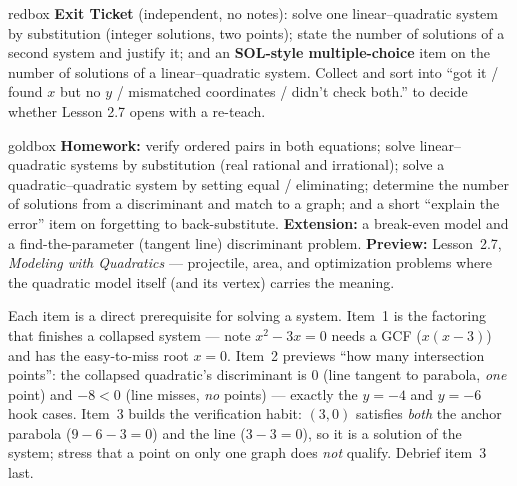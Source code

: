 \documentclass[10pt]{article}
\begin{document}
\begin{skillbox}{redbox}
\textbf{Exit Ticket} (independent, no notes): solve one linear--quadratic system by substitution (integer
solutions, two points); state the number of solutions of a second system and justify it; and an
\textbf{SOL-style multiple-choice} item on the number of solutions of a linear--quadratic system. Collect and sort
into ``got it / found $x$ but no $y$ / mismatched coordinates / didn't check both.'' to decide whether Lesson 2.7
opens with a re-teach.
\end{skillbox}

\begin{skillbox}{goldbox}
\textbf{Homework:} verify ordered pairs in both equations; solve linear--quadratic systems by substitution (real
rational and irrational); solve a quadratic--quadratic system by setting equal / eliminating; determine the number
of solutions from a discriminant and match to a graph; and a short ``explain the error'' item on forgetting to
back-substitute. \textbf{Extension:} a break-even model and a find-the-parameter (tangent line) discriminant
problem. \textbf{Preview:} Lesson~2.7, \emph{Modeling with Quadratics} --- projectile, area, and optimization
problems where the quadratic model itself (and its vertex) carries the meaning.
\end{skillbox}

\begin{teachernote}[Warm-Up]
Each item is a direct prerequisite for solving a system. Item~1 is the factoring that finishes a collapsed
system --- note $x^2-3x=0$ needs a GCF ($x(x-3)$) and has the easy-to-miss root $x=0$. Item~2 previews ``how many
intersection points'': the collapsed quadratic's discriminant is $0$ (line tangent to parabola, \emph{one} point)
and $-8<0$ (line misses, \emph{no} points) --- exactly the $y=-4$ and $y=-6$ hook cases. Item~3 builds the
verification habit: $(3,0)$ satisfies \emph{both} the anchor parabola ($9-6-3=0$) and the line ($3-3=0$), so it is
a solution of the system; stress that a point on only one graph does \emph{not} qualify. Debrief item~3 last.
\end{teachernote}
\end{document}

